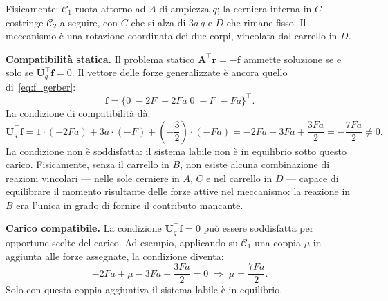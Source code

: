 \begin{esempio}
\begin{svolgimento}
		Fisicamente: $\mathcal{C}_1$ ruota attorno ad $A$
		di ampiezza $q$; la cerniera interna in $C$
		costringe $\mathcal{C}_2$ a seguire, con $C$ che si
		alza di $3a\,q$ e $D$ che rimane fisso. Il meccanismo
		è una rotazione coordinata dei due corpi, vincolata
		dal carrello in $D$.
		
		
		
		\noindent\textbf{Compatibilità statica.}
		Il problema statico $\bm{A}^\top\bm{r} = -\bm{f}$
		ammette soluzione se e solo se
		$\bm{U}_q^\top\bm{f} = 0$. Il vettore delle forze
		generalizzate è ancora quello di~\eqref{eq:f_gerber}:
		\begin{equation*}
			\bm{f} =
			\bigl\{0\; -2F\; -2Fa\;
			0\; -F\; -Fa
			\bigr\}^\top.
		\end{equation*}
		La condizione di compatibilità dà:
		\begin{equation*}
			\bm{U}_q^\top\bm{f} =
			1\cdot(-2Fa) + 3a\cdot(-F) +
			\left(-\frac{3}{2}\right)\cdot(-Fa)
			= -2Fa - 3Fa + \frac{3Fa}{2}
			= -\frac{7Fa}{2} \neq 0.
		\end{equation*}
		La condizione non è soddisfatta: il sistema labile
		non è in equilibrio sotto questo carico. Fisicamente,
		senza il carrello in $B$, non esiste alcuna
		combinazione di reazioni vincolari — nelle sole
		cerniere in $A$, $C$ e nel carrello in $D$ ---
		capace di equilibrare il momento risultante delle
		forze attive nel meccanismo: la reazione in $B$
		era l'unica in grado di fornire il contributo
		mancante.
		
		\vspace{6pt}
		\noindent\textbf{Carico compatibile.}
		La condizione $\bm{U}_q^\top\bm{f} = 0$ può
		essere soddisfatta per opportune scelte del
		carico. Ad esempio, applicando su $\mathcal{C}_1$
		una coppia $\mu$ in aggiunta alle forze assegnate,
		la condizione diventa:
		\begin{equation*}
			-2Fa + \mu - 3Fa + \frac{3Fa}{2} = 0
			\;\Longrightarrow\;
			\mu = \frac{7Fa}{2}.
		\end{equation*}
		Solo con questa coppia aggiuntiva il sistema
		labile è in equilibrio.
	\end{svolgimento}
\end{esempio}





